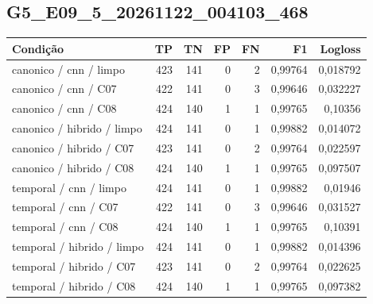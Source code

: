 \subsection{G5\_E09\_5\_20261122\_004103\_468}
\small\begin{longtable}{@{}p{.38\linewidth}rrrrrr@{}}
\toprule Condição & TP & TN & FP & FN & F1 & Logloss\\\midrule\endhead
canonico /\allowbreak{} cnn /\allowbreak{} limpo & 423 & 141 & 0 & 2 & 0,99764 & 0,018792\\
canonico /\allowbreak{} cnn /\allowbreak{} C07 & 422 & 141 & 0 & 3 & 0,99646 & 0,032227\\
canonico /\allowbreak{} cnn /\allowbreak{} C08 & 424 & 140 & 1 & 1 & 0,99765 & 0,10356\\
canonico /\allowbreak{} hibrido /\allowbreak{} limpo & 424 & 141 & 0 & 1 & 0,99882 & 0,014072\\
canonico /\allowbreak{} hibrido /\allowbreak{} C07 & 423 & 141 & 0 & 2 & 0,99764 & 0,022597\\
canonico /\allowbreak{} hibrido /\allowbreak{} C08 & 424 & 140 & 1 & 1 & 0,99765 & 0,097507\\
temporal /\allowbreak{} cnn /\allowbreak{} limpo & 424 & 141 & 0 & 1 & 0,99882 & 0,01946\\
temporal /\allowbreak{} cnn /\allowbreak{} C07 & 422 & 141 & 0 & 3 & 0,99646 & 0,031527\\
temporal /\allowbreak{} cnn /\allowbreak{} C08 & 424 & 140 & 1 & 1 & 0,99765 & 0,10391\\
temporal /\allowbreak{} hibrido /\allowbreak{} limpo & 424 & 141 & 0 & 1 & 0,99882 & 0,014396\\
temporal /\allowbreak{} hibrido /\allowbreak{} C07 & 423 & 141 & 0 & 2 & 0,99764 & 0,022625\\
temporal /\allowbreak{} hibrido /\allowbreak{} C08 & 424 & 140 & 1 & 1 & 0,99765 & 0,097382\\
\bottomrule\end{longtable}\normalsize

